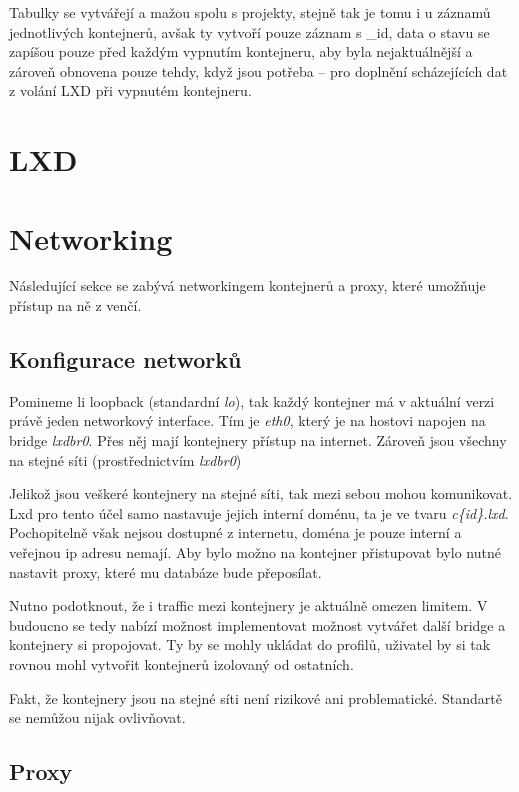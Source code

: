 \documentclass[a4paper,oneside,12pt]{report}
\begin{document}
Tabulky se vytvářejí a mažou spolu s projekty, stejně tak je tomu i u záznamů jednotlivých kontejnerů, avšak ty vytvoří pouze záznam s \_id, data o stavu se zapíšou pouze před každým vypnutím kontejneru, aby byla nejaktuálnější a zároveň obnovena pouze tehdy, když jsou potřeba -- pro doplnění scházejících dat z volání LXD při vypnutém kontejneru.

\section{LXD}

\section{Networking}

Následující sekce se zabývá networkingem kontejnerů a proxy, které umožňuje přístup na ně z venčí.

\subsection{Konfigurace networků}

Pomineme li loopback (standardní \textit{lo}), tak každý kontejner má v aktuální verzi právě jeden networkový interface.
Tím je \textit{eth0}, který je na hostovi napojen na bridge \textit{lxdbr0}.
Přes něj mají kontejnery přístup na internet.
Zároveň jsou všechny na stejné síti (prostřednictvím \textit{lxdbr0})

Jelikož jsou veškeré kontejnery na stejné síti, tak mezi sebou mohou komunikovat.
Lxd pro tento účel samo nastavuje jejich interní doménu, ta je ve tvaru \textit{c\{id\}.lxd}.
Pochopitelně však nejsou dostupné z internetu, doména je pouze interní a veřejnou ip adresu nemají.
Aby bylo možno na kontejner přistupovat bylo nutné nastavit proxy, které mu databáze bude přeposílat.

Nutno podotknout, že i traffic mezi kontejnery je aktuálně omezen limitem.
V budoucno se tedy nabízí možnost implementovat možnost vytvářet další bridge a kontejnery si propojovat.
Ty by se mohly ukládat do profilů, uživatel by si tak rovnou mohl vytvořit kontejnerů izolovaný od ostatních.

Fakt, že kontejnery jsou na stejné síti není rizikové ani problematické.
Standartě se nemůžou nijak ovlivňovat.

\subsection{Proxy}
\end{document}
